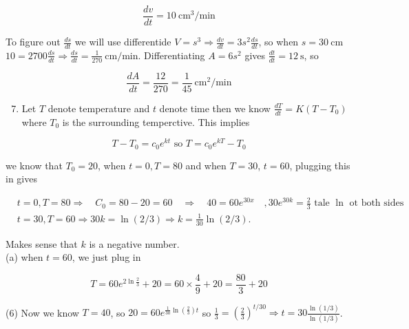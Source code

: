 \documentclass[10pt]{article}
\begin{document}
$$
\frac{d v}{d t}=10 \mathrm{~cm}^{3} / \mathrm{min}
$$

To figure out $\frac{d s}{d t}$ we will use differentide $V=s^{3} \Rightarrow \frac{d v}{d t}=3 s^{2} \frac{d s}{d t}$, so when $s=30 \mathrm{~cm}$ $10=2700 \frac{d s}{d t} \Rightarrow \frac{d s}{d t}=\frac{1}{270} \mathrm{~cm} / \mathrm{min}$. Differentiating $A=6 s^{2}$ gives $\frac{d t}{d t}=12 \mathrm{~s}$, so

$$
\frac{d A}{d t}=\frac{12}{270}=\frac{1}{45} \mathrm{~cm}^{2} / \mathrm{min}
$$

\begin{enumerate}
  \setcounter{enumi}{6}
  \item Let $T$ denote temperature and $t$ denote time then we know $\frac{d T}{d t}=K\left(T-T_{0}\right)$ where $T_{0}$ is the surrounding temperctive. This implies
\end{enumerate}

$$
T-T_{0}=c_{0} e^{k t} \text { so } T=c_{0} e^{k T}-T_{0}
$$

we know that $T_{0}=20$, when $t=0, T=80$ and when $T=30$, $t=60$, plugging this in gives

$$
\begin{aligned}
& t=0, T=80 \Rightarrow \quad C_{0}=80-20=60 \quad \Rightarrow \quad 40=60 e^{30 x} \quad, 30 e^{30 k}=\frac{2}{3} \text { tale } \ln \text { ot both sides } \\
& t=30, T=60 \Rightarrow 30 k=\ln (2 / 3) \Rightarrow k=\frac{1}{30} \ln (2 / 3) .
\end{aligned}
$$

Makes sense that $k$ is a negative number.\\
(a) when $t=60$, we just plug in

$$
T=60 e^{2 \ln \frac{2}{3}}+20=60 \times \frac{4}{9}+20=\frac{80}{3}+20
$$

(6) Now we know $T=40$, so $20=60 e^{\frac{1}{30} \ln \left(\frac{2}{3}\right) t}$ so $\frac{1}{3}=\left(\frac{2}{3}\right)^{t / 30} \Rightarrow t=30 \frac{\ln (1 / 3)}{\ln (1 / 3)}$.
\end{document}
